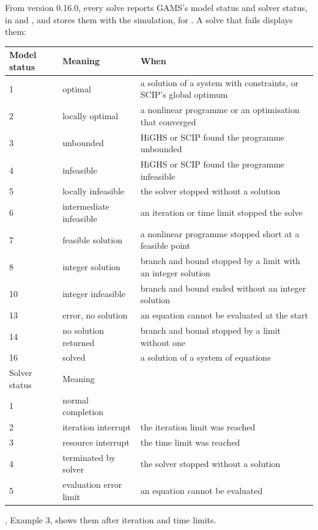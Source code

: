 From version 0.16.0, every solve reports GAMS's model status and solver
status, in  and , and stores them with
the simulation, for . A solve that fails displays them:
\begin{center}
\begin{tabular}{@{}l l p{}@{}}
\hline
Model status & Meaning & When\\
\hline
1 & optimal & a solution of a system with constraints, or SCIP's global optimum\\
2 & locally optimal & a nonlinear programme or an optimisation that converged\\
3 & unbounded & HiGHS or SCIP found the programme unbounded\\
4 & infeasible & HiGHS or SCIP found the programme infeasible\\
5 & locally infeasible & the solver stopped without a solution\\
6 & intermediate infeasible & an iteration or time limit stopped the solve\\
7 & feasible solution & a nonlinear programme stopped short at a feasible point\\
8 & integer solution & branch and bound stopped by a limit with an integer solution\\
10 & integer infeasible & branch and bound ended without an integer solution\\
13 & error, no solution & an equation cannot be evaluated at the start\\
14 & no solution returned & branch and bound stopped by a limit without one\\
16 & solved & a solution of a system of equations\\
\hline
Solver status & Meaning & \\
\hline
1 & normal completion & \\
2 & iteration interrupt & the iteration limit was reached\\
3 & resource interrupt & the time limit was reached\\
4 & terminated by solver & the solver stopped without a solution\\
5 & evaluation error limit & an equation cannot be evaluated\\
\hline
\end{tabular}
\end{center}
, Example 3, shows them after iteration and time limits.


